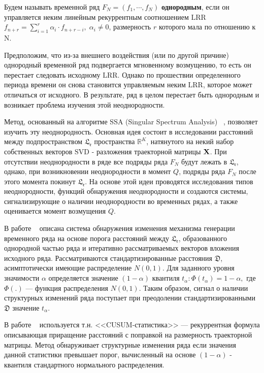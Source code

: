 \documentclass[specialist, substylefile = spbu.rtx,
			   subf, href, 12pt]{disser}
\begin{document}
\intro
Будем называть временной ряд $F_N = (f_1, \cdots, f_{N})$ \textbf{однородным}, если он управляется неким линейным рекуррентным соотношением $\mathrm{LRR}$ $f_{n+r} = \sum_{i=1}^{r} \alpha_i\cdot f_{n+r-i}, \; \alpha_i \neq 0$, размерность $ r $ которого мала по отношению к $\mathrm{N}$. 

Предположим, что из-за внешнего воздействия (или по другой причине) однородный временной ряд подвергается мгновенному возмущению, то есть он перестает следовать исходному $\mathrm{LRR}$. Однако по прошествии определенного периода времени он снова становится управляемым неким $\mathrm{LRR}$, которое может отличаться от исходного. В результате, ряд в целом перестает быть однородным и возникает проблема изучения этой неоднородности.

Метод, основанный на алгоритме $ \mathrm{SSA} $ (Singular Spectrum Analysis) ~\cite{Golyandina2001, Moskvina2010ChangeP, CPD}, позволяет изучить эту неоднородность. Основная идея состоит в исследовании расстояний между подпространством $ \mathfrak{L_r} $ пространства $ \mathbb{R}^K $, натянутого на некий набор собственных векторов $ \mathrm{SVD} $ - разложения траекторной матрицы $ \bold{X} $. При отсутствии неоднородности в ряде все подряды ряда $ F_N $ будут лежать в $ \mathfrak{L_r} $, однако, при возникновении неоднородности в момент $ Q $, подряды ряда $ F_N $ после этого момента покинут $ \mathfrak{L_r} $. На основе этой идеи проводятся исследования типов неоднородности, функций обнаружения неоднородности и создаются системы, сигнализирующие о наличии неоднородности во временных рядах, а также оценивается момент возмущения $ Q $.

В работе ~\cite{Moskvina2010ChangeP} описана система обнаружения изменения механизма генерации временного ряда на основе порога расстояний между $ \mathfrak{L_r} $, образованного однородной частью ряда и итеративно рассматриваемых векторов вложения исходного ряда. Рассматриваются стандартизированные расстояния $ \mathfrak{D} $, асимптотически имеющие распределение $ N(0, 1)$. Для заданного уровня значимости $ \alpha $ определяется значение $ (1-\alpha) $ квантиля $ t_\alpha: \Phi(t_\alpha) = 1 - \alpha, $ где $ \Phi(.) $ --- функция распределения $ N(0, 1) $. Таким образом, сигнал о наличии структурных изменений ряда поступает при преодолении стандартизированными $ \mathfrak{D} $ значение $ t_\alpha $. 

В работе ~\cite{CPD} используется т.н. <<CUSUM-статистика>> --- рекуррентная формула описывающая приращение расстояний с поправкой на размерность траекторной матрицы. Метод обнаруживает структурные изменения ряда если значения данной статистики превышает порог, вычисленный на основе $ (1 - \alpha) $ - квантиля стандартного нормального распределения.
\end{document}
